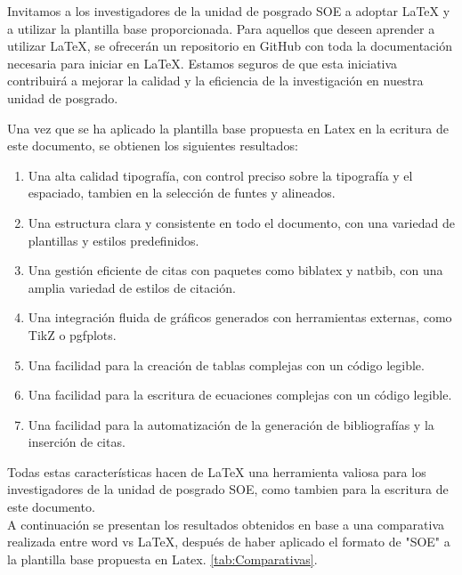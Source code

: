 \documentclass[10pt]{article}
\begin{document}
    Invitamos a los investigadores de la unidad de posgrado SOE a adoptar LaTeX y a utilizar la plantilla base proporcionada. 
    Para aquellos que deseen aprender a utilizar LaTeX, se ofrecerán un repositorio en GitHub con toda la documentación necesaria para iniciar en LaTeX. 
    Estamos seguros de que esta iniciativa contribuirá a mejorar la calidad y la eficiencia de la investigación en nuestra unidad de posgrado.  
    
Una vez que se ha aplicado la plantilla base propuesta en Latex en la ecritura de este documento, se obtienen los siguientes resultados:
    \begin{enumerate}
        \item Una alta calidad tipografía, con control preciso sobre la tipografía y el espaciado, tambien en la selección de funtes y alineados.
        \item Una estructura clara y consistente en todo el documento, con una variedad de plantillas y estilos predefinidos.
        \item Una gestión eficiente de citas con paquetes como biblatex y natbib, con una amplia variedad de estilos de citación.
        \item Una integración fluida de gráficos generados con herramientas externas, como TikZ o pgfplots.
        \item Una facilidad para la creación de tablas complejas con un código legible.
        \item Una facilidad para la escritura de ecuaciones complejas con un código legible.
        \item Una facilidad para la automatización de la generación de bibliografías y la inserción de citas.
    \end{enumerate}
Todas estas características hacen de LaTeX una herramienta valiosa para los investigadores de la unidad de posgrado SOE, como tambien para la escritura de este documento.\\
A continuación se presentan los resultados obtenidos en base a una comparativa realizada entre word vs LaTeX, después de haber aplicado el formato de "SOE" a la plantilla base propuesta en Latex.  \ref{tab:Comparativas}.
\end{document}
